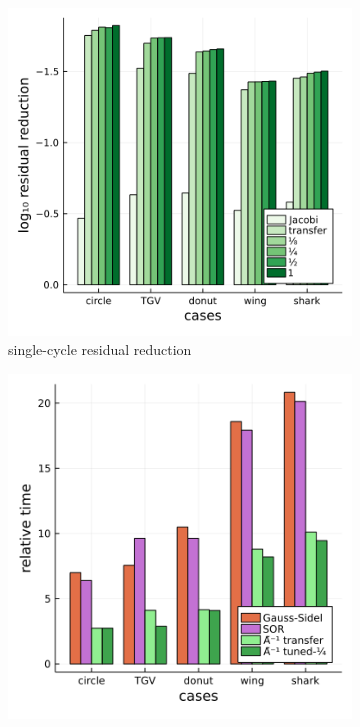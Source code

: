 \documentclass[]{elsarticle}
\begin{document}
\begin{figure}
    \centering
    \begin{subfigure}[b]{0.47\textwidth}
        \centering
        \includegraphics[width=\textwidth]{figures/scaleloss.png}
        \caption{single-cycle residual reduction}
        \label{fig:scaled loss}
    \end{subfigure}
    \hfill
    \begin{subfigure}[b]{0.47\textwidth}
        \centering
        \includegraphics[width=\textwidth]{figures/crosscount.png}

\end{subfigure}
\end{figure}
\end{document}
